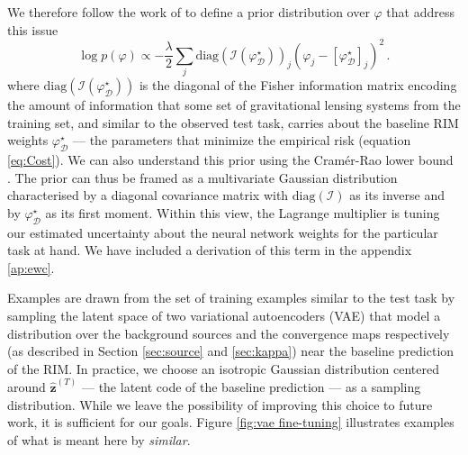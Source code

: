 We therefore follow the work of \citet{Kirkpatrick2016} to define a prior distribution
over $\varphi$ that address this issue
\begin{equation}\label{eq:Prior} 
        \log p(\varphi) \propto -\frac{\lambda}{2}\sum_{j} \mathrm{diag}(\mathcal{I}(\varphi_{\mathcal{D}}^{\star}))_{j} 
        (\varphi_j - [\varphi^{\star}_{\mathcal{D}}]_{j})^{2}\, .
\end{equation} 
where $\mathrm{diag}(\mathcal{I}(\varphi_{\mathcal{D}}^{\star}))$ is the diagonal of the 
Fisher information matrix 
encoding the amount of information that  
some set of gravitational lensing systems from 
the training set, and similar to the observed 
test task, carries about the baseline RIM weights $\varphi_{\mathcal{D}}^{\star}$ 
--- the parameters that minimize the empirical risk (equation \ref{eq:Cost}).
We can also understand this prior using the
Cramér-Rao lower bound 
\citep{Rao1945,Cramer1946}.
The prior can thus be framed as a multivariate 
Gaussian distribution characterised by a diagonal covariance matrix with $\mathrm{diag}(\mathcal{I})$ as its inverse 
and by $\varphi^{\star}_{\mathcal{D}}$ as its first moment. 
Within this view, the  
Lagrange multiplier is 
tuning our estimated uncertainty about the neural network weights 
for the particular task at hand.  
We have included a derivation 
of this term in the appendix \ref{ap:ewc}.

Examples are drawn from the set of training examples similar to the test task by sampling the latent space of two variational autoencoders (VAE) that model a distribution over the background sources and the convergence maps respectively (as described in Section \ref{sec:source} and \ref{sec:kappa}) near the baseline prediction of the RIM. In practice, we choose an isotropic Gaussian distribution centered around $\hat{\mathbf{z}}^{(T)}$ --- 
the latent code of the baseline prediction --- as a sampling distribution. While we leave the possibility of improving this choice to future work, it is sufficient for our goals. 
Figure \ref{fig:vae fine-tuning} illustrates examples of what is meant here by \textit{similar}. 

